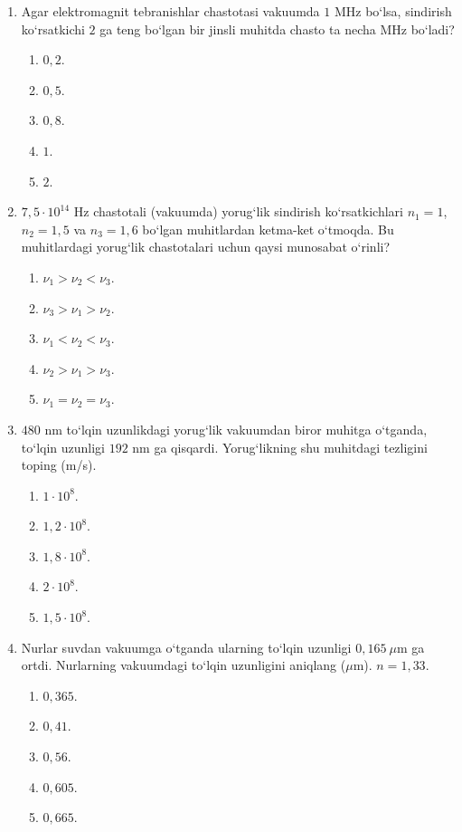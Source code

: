 \begin{enumerate}
\item Agar elektromagnit tebranishlar chastotasi vakuumda $1$ MHz bo‘lsa, sindirish ko‘rsatkichi $2$ ga teng bo‘lgan bir jinsli muhitda chasto ta necha MHz bo‘ladi?
\begin{enumerate}[label=\Alph*)]
\item $0,2$.
\item $0,5$.
\item $0,8$.
\item $1$.
\item $2$.
\end{enumerate}

\item $7{,}5\cdot10^{14}$ Hz chastotali (vakuumda) yorug‘lik sindirish ko‘rsatkichlari $n_1=1$, $n_2=1,5$ va $n_3=1,6$ bo‘lgan muhitlardan ketma-ket o‘tmoqda. Bu muhitlardagi yorug‘lik chastotalari uchun qaysi munosabat o‘rinli?
\begin{enumerate}[label=\Alph*)]
\item $\nu_1>\nu_2<\nu_3$.
\item $\nu_3>\nu_1>\nu_2$.
\item $\nu_1<\nu_2<\nu_3$.
\item $\nu_2>\nu_1>\nu_3$.
\item $\nu_1=\nu_2=\nu_3$.
\end{enumerate}

\item $480$ nm to‘lqin uzunlikdagi yorug‘lik vakuumdan biror muhitga o‘tganda, to‘lqin uzunligi $192$ nm ga qisqardi. Yorug‘likning shu muhitdagi tezligini toping (m/s).
\begin{enumerate}[label=\Alph*)]
\item $1\cdot10^8$.
\item $1,2\cdot10^8$.
\item $1,8\cdot10^8$.
\item $2\cdot10^8$.
\item $1,5\cdot10^8$.
\end{enumerate}

\item Nurlar suvdan vakuumga o‘tganda ularning to‘lqin uzunligi $0,165~\mu$m ga ortdi. Nurlarning vakuumdagi to‘lqin uzunligini aniqlang ($\mu$m). $n=1,33$.
\begin{enumerate}[label=\Alph*)]
\item $0,365$.
\item $0,41$.
\item $0,56$.
\item $0,605$.
\item $0,665$.
\end{enumerate}


\end{enumerate}

